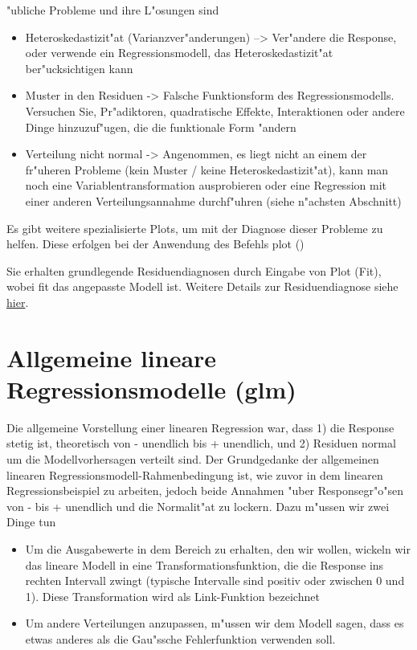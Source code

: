 \documentclass[a4paper,twoside]{tufte-book}\usepackage[]{graphicx}\usepackage[]{color}
\begin{document}
"ubliche Probleme und ihre L"osungen sind  

\begin{itemize}
  \item Heteroskedastizit"at (Varianzver"anderungen) --> Ver"andere die Response, oder verwende ein Regressionsmodell, das Heteroskedastizit"at ber"ucksichtigen kann
  \item Muster in den Residuen -> Falsche Funktionsform des Regressionsmodells. Versuchen Sie, Pr"adiktoren, quadratische Effekte, Interaktionen oder andere Dinge hinzuzuf"ugen, die die funktionale Form "andern
  \item Verteilung nicht normal -> Angenommen, es liegt nicht an einem der fr"uheren Probleme (kein Muster / keine Heteroskedastizit"at), kann man noch eine Variablentransformation ausprobieren oder eine Regression mit einer anderen Verteilungsannahme durchf"uhren (siehe n"achsten Abschnitt)
\end{itemize}  

Es gibt weitere spezialisierte Plots, um mit der Diagnose dieser Probleme zu helfen. Diese erfolgen bei der Anwendung des Befehls plot ()


Sie erhalten grundlegende Residuendiagnosen durch Eingabe von Plot (Fit), wobei fit das angepasste Modell ist. Weitere Details zur Residuendiagnose siehe \href{http://www.statmethods.net/stats/rdiagnostics.html}{hier}.



\section{Allgemeine lineare Regressionsmodelle (glm)}

Die allgemeine Vorstellung einer linearen Regression war, dass 1) die Response stetig ist, theoretisch von - unendlich bis + unendlich, und 2) Residuen normal um die Modellvorhersagen verteilt sind. Der Grundgedanke der allgemeinen linearen Regressionsmodell-Rahmenbedingung ist, wie zuvor in dem linearen Regressionsbeispiel zu arbeiten, jedoch beide Annahmen "uber Responsegr"o"sen von - bis + unendlich und die Normalit"at zu lockern. Dazu m"ussen wir zwei Dinge tun

\begin{itemize}
  \item Um die Ausgabewerte in dem Bereich zu erhalten, den wir wollen, wickeln wir das lineare Modell in eine Transformationsfunktion, die die Response ins rechten Intervall zwingt (typische Intervalle sind positiv oder zwischen 0 und 1). Diese Transformation wird als Link-Funktion bezeichnet
  \item Um andere Verteilungen anzupassen, m"ussen wir dem Modell sagen, dass es etwas anderes als die Gau"ssche Fehlerfunktion verwenden soll.
\end{itemize}    
   
\end{document}
